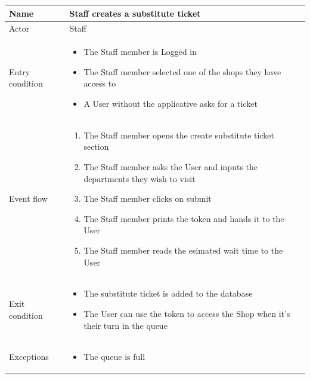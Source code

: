 \begin{table}[H]
    \begin{tabu} to \textwidth {|X|X[4]|}
        \hline
        Name            & Staff creates a substitute ticket \\ \hline
        Actor           & Staff                             \\ \hline
        Entry condition & \begin{itemize}
            \item The Staff member is Logged in
            \item The Staff member selected one of the shops they have access to
            \item A User without the applicative asks for a ticket
        \end{itemize}        \\ \hline
        Event flow      & \begin{enumerate}
            \item The Staff member opens the create substitute ticket section
            \item The Staff member asks the User and inputs the departments they wish to visit
            \item The Staff member clicks on submit
            \item The Staff member prints the token and hands it to the User
            \item The Staff member reads the esimated wait time to the User
        \end{enumerate}        \\ \hline
        Exit condition  & \begin{itemize}
            \item The substitute ticket is added to the database
            \item The User can use the token to access the Shop when it's their turn in the queue
        \end{itemize}        \\ \hline
        Exceptions      & \begin{itemize}
            \item The queue is full
        \end{itemize}        \\ \hline
    \end{tabu}
\end{table}

